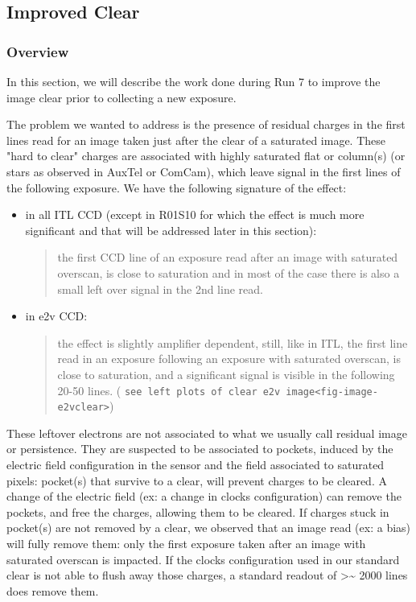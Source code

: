 \subsection{Improved Clear}\label{improved-clear}

\subsubsection{Overview}\label{overview}

In this section, we will describe the work done during Run 7 to improve
the image clear prior to collecting a new exposure.

The problem we wanted to address is the presence of residual charges in
the first lines read for an image taken just after the clear of a saturated
image. These "hard to clear" charges are associated with highly
saturated flat or column(s) (or stars as observed in AuxTel or ComCam),
which leave signal in the first lines of the following exposure. We have
the following signature of the effect:

\begin{itemize}
\item
  in all ITL CCD (except in R01\label{s10}{S10} for which
  the effect is much more significant and that will be addressed later
  in this section):

  \begin{quote}
  the first CCD line of an exposure read after an image with saturated
  overscan, is close to saturation and in most of the case there is also
  a small left over signal in the 2nd line read.
  \end{quote}
\item
  in e2v CCD:

  \begin{quote}
  the effect is slightly amplifier dependent, still, like in ITL, the
  first line read in an exposure following an exposure with saturated
  overscan, is close to saturation, and a significant signal is visible
  in the following 20-50 lines. (
  \texttt{see\ left\ plots\ of\ clear\ e2v\ image\textless{}fig-image-e2vclear\textgreater{}})
  \end{quote}
\end{itemize}

These leftover electrons are not associated to what we usually call 
residual image or persistence. They are suspected to be associated to
pockets, induced by the electric field configuration in the sensor and
the field associated to saturated pixels: pocket(s) that survive to a
clear, will prevent charges to be cleared. A change of the electric
field (ex: a change in clocks configuration) can remove the pockets, and
free the charges, allowing them to be cleared. If charges stuck in
pocket(s) are not removed by a clear, we observed that an image read
(ex: a bias) will fully remove them: only the first exposure taken after
an image with saturated overscan is impacted. If the clocks
configuration used in our standard clear is not able to flush away those
charges, a standard readout of \textgreater\textasciitilde{} 2000 lines
does remove them.

